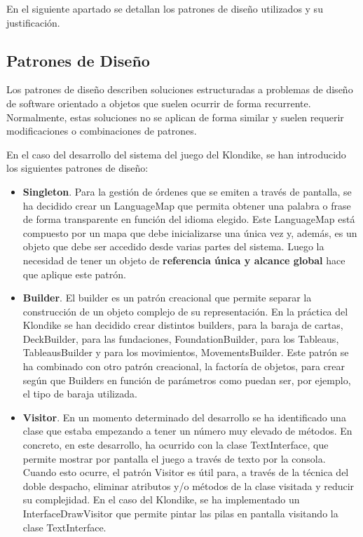 \documentclass[11pt]{article}
\begin{document}
En el siguiente apartado se detallan los patrones de diseño utilizados y su justificación.

\subsection{Patrones de Diseño}

Los patrones de diseño describen soluciones estructuradas a problemas de diseño de software orientado a objetos que suelen ocurrir de forma recurrente. Normalmente, estas soluciones no se aplican de forma similar y suelen requerir modificaciones o combinaciones de patrones.

En el caso del desarrollo del sistema del juego del Klondike, se han introducido los siguientes patrones de diseño:

\begin{itemize}
\item{\textbf{Singleton}}. Para la gestión de órdenes que se emiten a través de pantalla, se ha decidido crear un LanguageMap que permita obtener una palabra o frase de forma transparente en función del idioma elegido. Este LanguageMap está compuesto por un mapa que debe inicializarse una única vez y, además, es un objeto que debe ser accedido desde varias partes del sistema. Luego la necesidad de tener un objeto de \textbf{referencia única y alcance global} hace que aplique este patrón.
\item{\textbf{Builder}}. El builder es un patrón creacional que permite separar la construcción de un objeto complejo de su representación. En la práctica del Klondike se han decidido crear distintos builders, para la baraja de cartas, DeckBuilder, para las fundaciones, FoundationBuilder, para los Tableaus, TableausBuilder y para los movimientos, MovementsBuilder. Este patrón se ha combinado con otro patrón creacional, la factoría de objetos, para crear según que Builders en función de parámetros como puedan ser, por ejemplo, el tipo de baraja utilizada.
\item{\textbf{Visitor}}. En un momento determinado del desarrollo se ha identificado una clase que estaba empezando a tener un número muy elevado de métodos. En concreto, en este desarrollo, ha ocurrido con la clase TextInterface, que permite mostrar por pantalla el juego a través de texto por la consola. Cuando esto ocurre, el patrón Visitor es útil para, a través de la técnica del doble despacho, eliminar atributos y/o métodos de la clase visitada y reducir su complejidad. En el caso del Klondike, se ha implementado un InterfaceDrawVisitor que permite pintar las pilas en pantalla visitando la clase TextInterface.
\end{itemize}
\end{document}

